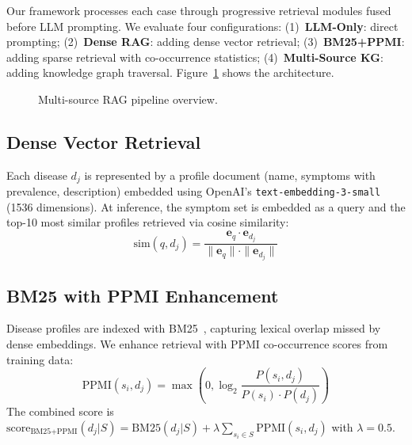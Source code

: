 \documentclass[preprint,12pt]{elsarticle}
\begin{document}
Our framework processes each case through progressive retrieval modules fused before LLM prompting. We evaluate four configurations: (1)~\textbf{LLM-Only}: direct prompting; (2)~\textbf{Dense RAG}: adding dense vector retrieval; (3)~\textbf{BM25+PPMI}: adding sparse retrieval with co-occurrence statistics; (4)~\textbf{Multi-Source KG}: adding knowledge graph traversal. Figure~\ref{fig:architecture} shows the architecture.

\begin{figure}[t]
\centering
{}
\caption{Multi-source RAG pipeline overview.}
\label{fig:architecture}
\end{figure}

\subsection{Dense Vector Retrieval}

Each disease $d_j$ is represented by a profile document (name, symptoms with prevalence, description) embedded using OpenAI's \texttt{text-embedding-3-small} (1536 dimensions). At inference, the symptom set is embedded as a query and the top-10 most similar profiles retrieved via cosine similarity:
\begin{equation}
    \text{sim}(q, d_j) = \frac{\mathbf{e}_q \cdot \mathbf{e}_{d_j}}{\|\mathbf{e}_q\| \cdot \|\mathbf{e}_{d_j}\|}
\end{equation}

\subsection{BM25 with PPMI Enhancement}

Disease profiles are indexed with BM25~\cite{robertson2009probabilistic}, capturing lexical overlap missed by dense embeddings. We enhance retrieval with PPMI co-occurrence scores from training data:
\begin{equation}
    \text{PPMI}(s_i, d_j) = \max\left(0, \log_2 \frac{P(s_i, d_j)}{P(s_i) \cdot P(d_j)}\right)
\end{equation}
The combined score is $\text{score}_{\text{BM25+PPMI}}(d_j | S) = \text{BM25}(d_j | S) + \lambda \sum_{s_i \in S} \text{PPMI}(s_i, d_j)$ with $\lambda = 0.5$.
\end{document}
